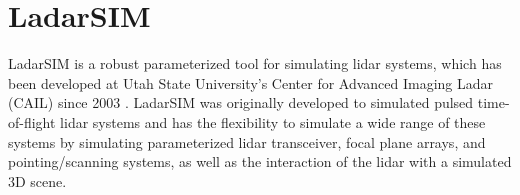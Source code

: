 \chapter{LadarSIM}

LadarSIM is a robust parameterized tool for simulating lidar systems, which has been
developed at Utah State University's Center for Advanced Imaging Ladar (CAIL) since 2003
\cite{budgeLeishman,neilsenBudge}. LadarSIM was originally developed to simulated pulsed 
time-of-flight lidar systems and has the flexibility to simulate
a wide range of these systems by simulating parameterized lidar transceiver, focal plane 
arrays, and pointing/scanning systems, as well as the interaction of the lidar with a 
simulated 3D scene. 

